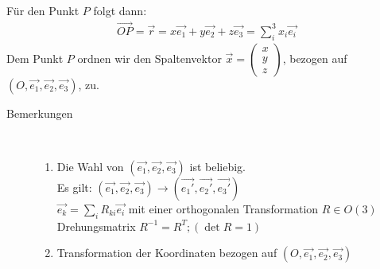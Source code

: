 Für den Punkt $P$ folgt dann:
\begin{align*}
\vec{OP}=\vec{r}=x\vec{e_1}+y\vec{e_2}+z\vec{e_3}=\sum_i^3 x_i\vec{e_i}
\end{align*}
Dem Punkt $P$ ordnen wir den Spaltenvektor $\vec{x}=\begin{pmatrix}
x \\
y \\
z
\end{pmatrix} $, bezogen auf $(O,\vec{e_1},\vec{e_2},\vec{e_3})$, zu.
\begin{description}
\item[Bemerkungen]~\par
\begin{enumerate}
\item Die Wahl von $(\vec{e_1},\vec{e_2},\vec{e_3})$ ist beliebig.\\
  Es gilt: $(\vec{e_1},\vec{e_2},\vec{e_3})\rightarrow(\vec{e_1'},\vec{e_2'},\vec{e_3'})$\\
  $\vec{e_k}=\sum_i R_{ki} \vec{e_i}$ mit einer orthogonalen
  Transformation $R\in O(3)$ Drehungsmatrix $R^{-1}=R^T; (\det R=1)$
\item Transformation der Koordinaten bezogen auf $(O,\vec{e_1},\vec{e_2},\vec{e_3})$
\end{enumerate}
\end{description}

